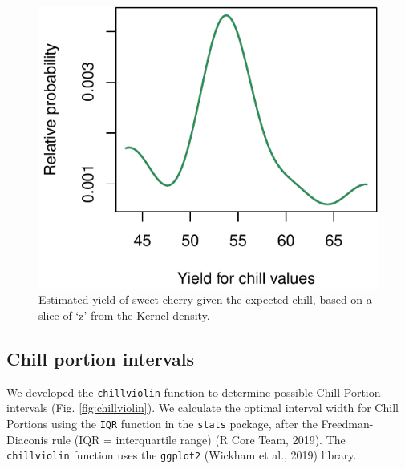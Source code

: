 \documentclass[]{article}
\begin{document}
\begin{figure}
\centering
\includegraphics{Full_SHE_Chill_Yield_Model_files/figure-latex/chillkernelslice-1.pdf}
\caption{\label{fig:chillkernelslice}Estimated yield of sweet cherry
given the expected chill, based on a slice of `z' from the Kernel
density.}
\end{figure}

\hypertarget{chill-portion-intervals}{%
\subsection{Chill portion intervals}\label{chill-portion-intervals}}

We developed the \texttt{chillviolin} function to determine possible
Chill Portion intervals (Fig. \ref{fig:chillviolin}). We calculate the
optimal interval width for Chill Portions using the \texttt{IQR}
function in the \texttt{stats} package, after the Freedman-Diaconis rule
(IQR = interquartile range) (R Core Team, 2019). The
\texttt{chillviolin} function uses the \texttt{ggplot2} (Wickham et al.,
2019) library.
\end{document}

